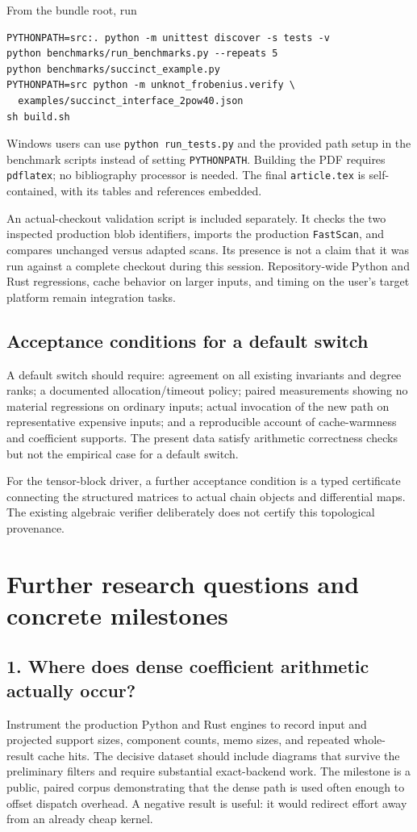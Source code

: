 \documentclass[11pt]{article}
\theoremstyle{definition}\newtheorem{definition}[theorem]{Definition}
\theoremstyle{remark}\newtheorem{remark}[theorem]{Remark}
\newcommand{\code}[1]{\texttt{#1}}
\begin{document}
From the bundle root, run
\begin{lstlisting}
PYTHONPATH=src:. python -m unittest discover -s tests -v
python benchmarks/run_benchmarks.py --repeats 5
python benchmarks/succinct_example.py
PYTHONPATH=src python -m unknot_frobenius.verify \
  examples/succinct_interface_2pow40.json
sh build.sh
\end{lstlisting}
Windows users can use \code{python run\_tests.py} and the provided path setup in the benchmark scripts instead of setting \code{PYTHONPATH}. Building the PDF requires \code{pdflatex}; no bibliography processor is needed. The final \code{article.tex} is self-contained, with its tables and references embedded.

An actual-checkout validation script is included separately. It checks the two inspected production blob identifiers, imports the production \code{FastScan}, and compares unchanged versus adapted scans. Its presence is not a claim that it was run against a complete checkout during this session. Repository-wide Python and Rust regressions, cache behavior on larger inputs, and timing on the user's target platform remain integration tasks.

\subsection{Acceptance conditions for a default switch}
A default switch should require: agreement on all existing invariants and degree ranks; a documented allocation/timeout policy; paired measurements showing no material regressions on ordinary inputs; actual invocation of the new path on representative expensive inputs; and a reproducible account of cache-warmness and coefficient supports. The present data satisfy arithmetic correctness checks but not the empirical case for a default switch.

For the tensor-block driver, a further acceptance condition is a typed certificate connecting the structured matrices to actual chain objects and differential maps. The existing algebraic verifier deliberately does not certify this topological provenance.

\section{Further research questions and concrete milestones}
\label{sec:questions}
\subsection{1. Where does dense coefficient arithmetic actually occur?}
Instrument the production Python and Rust engines to record input and projected support sizes, component counts, memo sizes, and repeated whole-result cache hits. The decisive dataset should include diagrams that survive the preliminary filters and require substantial exact-backend work. The milestone is a public, paired corpus demonstrating that the dense path is used often enough to offset dispatch overhead. A negative result is useful: it would redirect effort away from an already cheap kernel.
\end{document}
